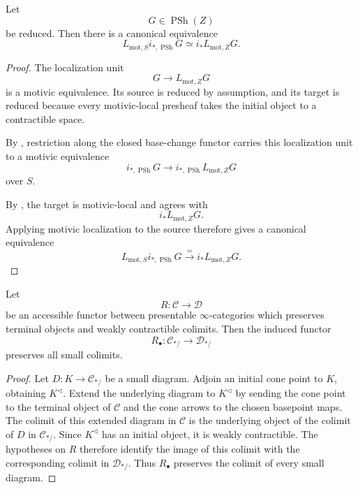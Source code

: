 \begin{corollary}
\label{cor:closed-restriction-motivic-localization}
Let
\[
    G
    \in
    \operatorname{PSh}(Z)
\]
be reduced.  Then there is a canonical equivalence
\[
    L_{\mathrm{mot},S}
    i_{*,\operatorname{PSh}}G
    \simeq
    i_*L_{\mathrm{mot},Z}G.
\]
\end{corollary}

\begin{proof}
The localization unit
\[
    G
    \longrightarrow
    L_{\mathrm{mot},Z}G
\]
is a motivic equivalence.  Its source is reduced by assumption, and its
target is reduced because every motivic-local presheaf takes the
initial object to a contractible space.

By
,
restriction along the closed base-change functor carries this
localization unit to a motivic equivalence
\[
    i_{*,\operatorname{PSh}}G
    \longrightarrow
    i_{*,\operatorname{PSh}}
    L_{\mathrm{mot},Z}G
\]
over \(S\).

By
,
the target is motivic-local and agrees with
\[
    i_*L_{\mathrm{mot},Z}G.
\]
Applying motivic localization to the source therefore gives a canonical
equivalence
\[
    L_{\mathrm{mot},S}
    i_{*,\operatorname{PSh}}G
    \xrightarrow{\simeq}
    i_*L_{\mathrm{mot},Z}G.
\]
\end{proof}

\begin{lemma}
\label{lem:pointed-colimits-from-weakly-contractible}
Let
\[
    R
    \colon
    \mathcal C
    \longrightarrow
    \mathcal D
\]
be an accessible functor between presentable \(\infty\)-categories
which preserves terminal objects and weakly contractible colimits.
Then the induced functor
\[
    R_\bullet
    \colon
    \mathcal C_{*/}
    \longrightarrow
    \mathcal D_{*/}
\]
preserves all small colimits.
\end{lemma}

\begin{proof}
Let \(D:K\to\mathcal C_{*/}\) be a small diagram.  Adjoin an initial
cone point to \(K\), obtaining \(K^\triangleleft\).  Extend the
underlying diagram to \(K^\triangleleft\) by sending the cone point to
the terminal object of \(\mathcal C\) and the cone arrows to the chosen
basepoint maps.  The colimit of this extended diagram in \(\mathcal C\)
is the underlying object of the colimit of \(D\) in
\(\mathcal C_{*/}\).  Since \(K^\triangleleft\) has an initial object,
it is weakly contractible.  The hypotheses on \(R\) therefore identify
the image of this colimit with the corresponding colimit in
\(\mathcal D_{*/}\).  Thus \(R_\bullet\) preserves the colimit of every
small diagram.
\end{proof}


